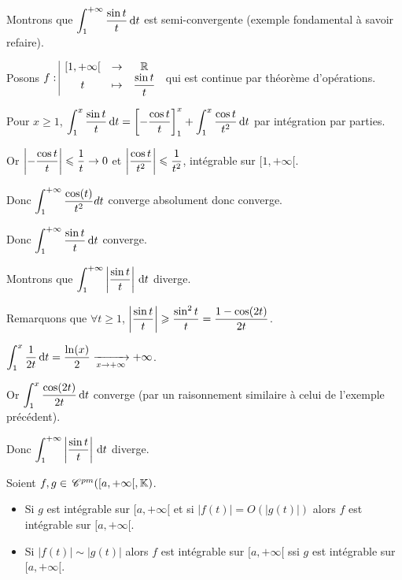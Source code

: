 \begin{exemple}
    Montrons que $\displaystyle \int_{1 }^{+ \infty   } \frac{\sin t }{t } \,\mathrm{d}t$ est semi-convergente (exemple fondamental à savoir refaire). 


    Posons $f: \space \begin{array}{|ccc} \displaystyle [1, + \infty[ & \to & \displaystyle \mathbb{R} \\ \displaystyle t & \mapsto & \displaystyle \frac{\sin t}{t} \end{array}$ qui est continue par théorème d'opérations.

    Pour $x \geqslant 1$, $\displaystyle \int_{1 }^{x } \frac{\sin t}{t} \,\mathrm{d}t = \left[ - \frac{\cos t}{t} \right]_1^x + \int_1^x \frac{\cos t}{t^2} \,\mathrm{d}t$
    par intégration par parties.

    Or $\displaystyle \left| -\frac{\cos t}{t} \right| \leqslant \frac{1}{t} \to 0$ 
    et $\displaystyle \left| \frac{\cos t}{t^2} \right| \leqslant \frac{1}{t^2}$, intégrable sur $[1, + \infty[$.

    Donc $\displaystyle \int_1^{+\infty} \frac{\cos(t)}{t^2} dt$ converge absolument donc converge.

    Donc $\displaystyle \int_{1 }^{+ \infty   } \frac{\sin t }{t } \,\mathrm{d}t$ converge.


    Montrons que $\displaystyle \int_{1 }^{+ \infty   } \left| \frac{\sin t }{t } \right| \,\mathrm{d}t$ diverge.

    Remarquons que $\forall t \geqslant 1$, $\displaystyle \left| \frac{\sin t}{t} \right| \geqslant \frac{\sin^2 t}{t} = \frac{1 - \cos(2t)}{2t}$.

    $\displaystyle \int_{1}^{x } \frac 1 {2t} \,\mathrm{d}t = \frac{\ln(x)}{2} \xrightarrow[x \to + \infty   ]{} + \infty$.

    Or $\displaystyle \int_{1}^{x } \frac{\cos(2t)}{2t} \,\mathrm{d}t$ converge (par un raisonnement similaire à celui de l'exemple précédent).

    Donc $\displaystyle \int_{1 }^{+ \infty   } \left| \frac{\sin t }{t } \right| \,\mathrm{d}t$ diverge.
\end{exemple}



\begin{theoreme}{}{}
    Soient $f, g \in \,\mathscr C^{pm}([a, + \infty[, \mathbb{K})$. 

    \begin{itemize}
        \item Si $g$ est intégrable sur $[a, + \infty[$ et si $|f(t)| = O(|g(t)|)$ alors $f$ est 
        intégrable sur $[a, + \infty[$.
        \item Si $|f(t)| \sim |g(t)|$ alors $f$ est intégrable sur $[a, + \infty[$ ssi $g$ est intégrable sur $[a, + \infty[$.
    \end{itemize}
\end{theoreme}

